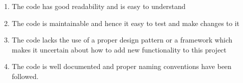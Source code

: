 \begin{enumerate}
    \item The code has good readability and is easy to understand
    \item The code is maintainable and hence it easy to test and make changes to it
    \item The code lacks the use of a proper design pattern or a framework which makes it uncertain about how to add new functionality to this project
    \item The code is well documented and proper naming conventions have been followed.
\end{enumerate}